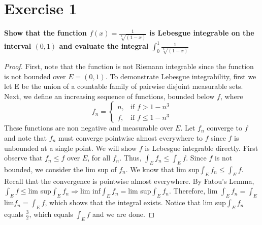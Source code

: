 \documentclass[paper=a4, fontsize=11pt]{scrartcl} %
\begin{document}
\section*{Exercise 1}
\boldmath
\textbf{Show that the function $f(x) = \frac{1}{\sqrt[3]{(1-x)}}$ is Lebesgue integrable on the interval $(0, 1)$ and evaluate the integral $\int_{0}^{1} \frac{1}{\sqrt[3]{(1-x)}}$ }
\unboldmath
\begin{proof}
First, note that the function is not Riemann integrable since the function is not bounded over $E = (0, 1)$.  To demonstrate Lebesgue integrability, first we let E be the union of a countable family of pairwise disjoint measurable sets.  Next, we define an increasing sequence of functions, bounded below $f$, where
$$
f_n = 
\begin{cases}
n, & \text{if } f > 1 - n^3 \\
f, & \text{if } f \leq 1 -n^3
\end{cases}$$
These functions are non negative and measurable over $E$.  Let $f_n$ converge to $f$ and note that $f_n$ must converge pointwise almost everywhere to $f$ since $f$ is unbounded at a single point.
\newline
We will show $f$ is Lebesgue integrable directly.
\newline
First observe that $f_n \leq f$ over $E$, for all $f_n$.
\newline
Thus, $\int_E f_n \leq \int_E f.$  Since $f$ is not bounded, we consider the lim sup of $f_n$.  We know that lim sup$\int_E f_n \leq \int_E f$.  Recall that the convergence is pointwise almost everywhere.  By Fatou's Lemma, $\int_E f \leq $lim sup$\int_E f_n \Rightarrow $lim inf$\int_E f_n = $lim sup$ \int_E f_n$.  Therefore, lim $\int_E f_n = \int_E $lim$ f_n = \int_E f$, which shows that the integral exists.
\newline
Notice that lim sup$\int_E f_n$ equals $\frac{3}{2}$, which equals $\int_E f$ and we are done.
\end{proof}
\end{document}
